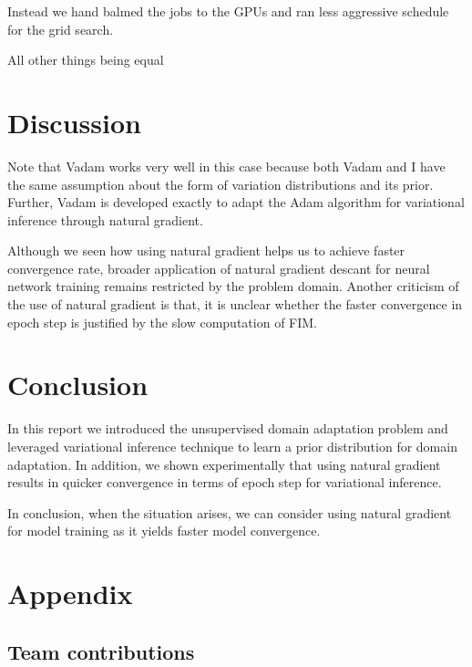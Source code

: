 \documentclass[10pt,twocolumn,letterpaper]{article}
\begin{document}
Instead we hand balmed the jobs to the GPUs and ran less aggressive schedule for the grid search. 

All other things being equal   


\section{Discussion}
Note that Vadam works very well in this case because both Vadam and I have the same assumption about the form of variation distributions and its prior. Further, Vadam is developed exactly to adapt the Adam algorithm for variational inference through natural gradient.

Although we seen how using natural gradient helps us to achieve faster convergence rate, broader application of natural gradient descant for neural network training remains restricted by the problem domain. 
Another criticism of the use of natural gradient is that, it is unclear whether the faster convergence in epoch step is justified by the slow computation of FIM. 

\section{Conclusion}

In this report we introduced the unsupervised domain adaptation problem and leveraged variational inference technique to learn a prior distribution for domain adaptation.
In addition, we shown experimentally that using natural gradient results in quicker convergence in terms of epoch step for variational inference.

In conclusion, when the situation arises, we can consider using natural gradient for model training as it yields faster model convergence.
{\small


}

\section*{Appendix}

\subsection*{Team contributions}

\begin{description}
	
\end{description}
\end{document}
